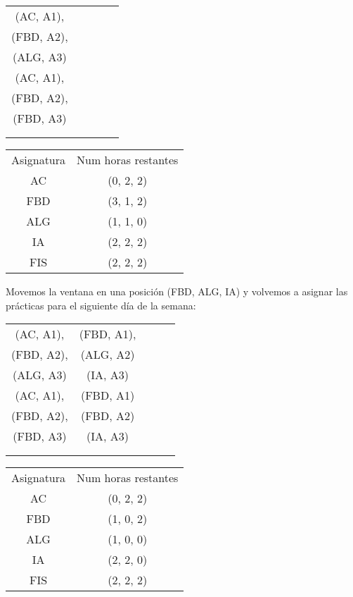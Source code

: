 \begin{minipage}{0.5\textwidth}    
\begin{tabular}{| c | c | c | c | c |}
\hline
 (AC, A1), &  &  &  & \\
 (FBD, A2), &  &  &  & \\
 (ALG, A3) &  &  &  & \\
 \hline
 (AC, A1), &  &  &  & \\
 (FBD, A2), &  &  &  & \\
 (FBD, A3) &  &  &  & \\
 \hline
 &  &  &  & \\
 \hline
 &  &  &  & \\
 \hline 
\end{tabular}
\end{minipage}
\begin{minipage}{0.5\textwidth}
\begin{tabular}{c | c}
Asignatura & Num horas restantes \\
AC & (0, 2, 2) \\
FBD & (3, 1, 2) \\
ALG & (1, 1, 0) \\
IA & (2, 2, 2) \\
FIS & (2, 2, 2)
\end{tabular}
\end{minipage}

Movemos la ventana en una posición (FBD, ALG, IA) y volvemos a asignar las prácticas para el siguiente día de la semana:

\begin{minipage}{0.5\textwidth}    
\begin{tabular}{| c | c | c | c | c |}
\hline
 (AC, A1), & (FBD, A1), &  &  & \\
 (FBD, A2), & (ALG, A2) &  &  & \\
 (ALG, A3) &  (IA, A3) &  &  & \\
 \hline
 (AC, A1), & (FBD, A1) &  &  & \\
 (FBD, A2), & (FBD, A2) &  &  & \\
 (FBD, A3) & (IA, A3) &  &  & \\
 \hline
 &  &  &  & \\
 \hline
 &  &  &  & \\
 \hline 
\end{tabular}
\end{minipage}
\begin{minipage}{0.5\textwidth}
\begin{tabular}{c | c}
Asignatura & Num horas restantes \\
AC & (0, 2, 2) \\
FBD & (1, 0, 2) \\
ALG & (1, 0, 0) \\
IA & (2, 2, 0) \\
FIS & (2, 2, 2)
\end{tabular}
\end{minipage}

